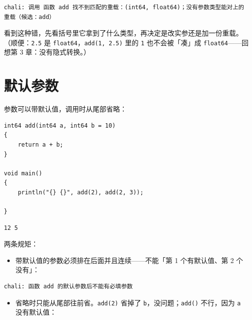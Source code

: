 \par
\medskip
\begin{lstlisting}[style=out]
chali: 调用 函数 add 找不到匹配的重载：(int64, float64)；没有参数类型能对上的重载（候选：add）
\end{lstlisting}
\par
\medskip

看到这种错，先看括号里它拿到了什么类型，再决定是改实参还是加一份重载。（顺便：\texttt{2.\allowbreak{}5} 是 \texttt{float64}，\texttt{add(\allowbreak{}1,\allowbreak{} 2.\allowbreak{}5)\allowbreak{}} 里的 \texttt{1} 也不会被「凑」成 \texttt{float64}——回想第 3 章：没有隐式转换。）

\section{默认参数}

参数可以带默认值，调用时从尾部省略：

\par
\medskip
\begin{lstlisting}[style=chali]
int64 add(int64 a, int64 b = 10)
{
    return a + b;
}

void main()
{
    println("{} {}", add(2), add(2, 3));

}
\end{lstlisting}
\par
\medskip

\par
\medskip
\begin{lstlisting}[style=out]
12 5
\end{lstlisting}
\par
\medskip

两条规矩：

\begin{itemize}

\item 带默认值的参数必须排在后面并且连续——不能「第 1 个有默认值、第 2 个没有」：

\end{itemize}

\par
\medskip
\begin{lstlisting}[style=out]
chali: 函数 add 的默认参数后不能有必填参数
\end{lstlisting}
\par
\medskip

\begin{itemize}

\item 省略时只能从尾部往前省。\texttt{add(\allowbreak{}2)\allowbreak{}} 省掉了 \texttt{b}，没问题；\texttt{add(\allowbreak{})\allowbreak{}} 不行，因为 \texttt{a} 没有默认值：

\end{itemize}


